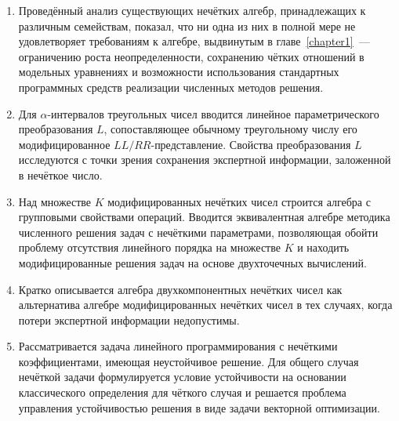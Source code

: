 \begin{enumerate}
  \item Проведённый анализ существующих нечётких алгебр, принадлежащих к различным семействам, показал, что ни одна из них в полной мере не удовлетворяет требованиям к алгебре, выдвинутым в главе~\ref{chapter1}~--- ограничению роста неопределенности, сохранению чётких отношений в модельных уравнениях и возможности использования стандартных программных средств реализации численных методов решения.
  \item Для $\alpha$-интервалов треугольных чисел вводится линейное параметрического преобразования $L$, сопоставляющее обычному треугольному числу его модифицированное $LL/RR$-представление. Свойства преобразования $L$ исследуются с точки зрения сохранения экспертной информации, заложенной в нечёткое число.
  \item Над множестве $K$ модифицированных нечётких чисел строится алгебра с групповыми свойствами операций. Вводится эквивалентная алгебре методика численного решения задач с нечёткими параметрами, позволяющая обойти проблему отсутствия линейного порядка на множестве $K$ и находить модифицированные решения задач на основе двухточечных вычислений.
  \item Кратко описывается алгебра двухкомпонентных нечётких чисел как альтернатива алгебре модифицированных нечётких чисел в тех случаях, когда потери экспертной информации недопустимы.
  \item Рассматривается задача линейного программирования с нечёткими коэффициентами, имеющая неустойчивое решение. Для общего случая нечёткой задачи формулируется условие устойчивости на основании классического определения для чёткого случая и решается проблема управления устойчивостью решения в виде задачи векторной оптимизации.
\end{enumerate}